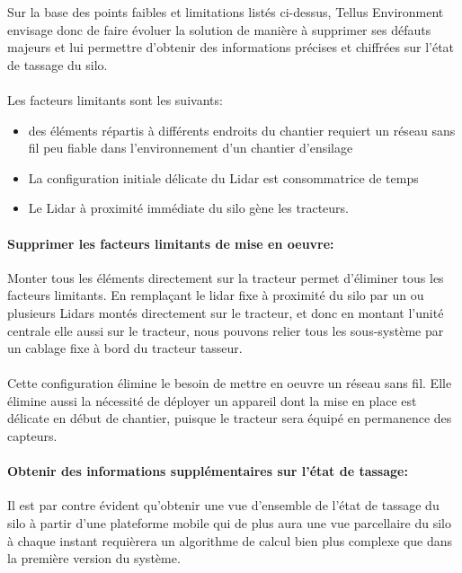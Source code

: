\documentclass[12pt,a4paper]{report}
\begin{document}
Sur la base des points faibles et limitations listés ci-dessus, Tellus Environment envisage donc de faire évoluer la solution de manière à supprimer ses défauts majeurs et lui permettre d'obtenir des informations précises et chiffrées sur l'état de tassage du silo.

\paragraph{} Les facteurs limitants sont les suivants:

\begin{itemize}
	\item des éléments répartis à différents endroits du chantier requiert un réseau sans fil peu fiable dans l'environnement d'un chantier d'ensilage
	\item La configuration initiale délicate du Lidar est consommatrice de temps
	\item Le Lidar à proximité immédiate du silo gène les tracteurs.
\end{itemize}

\paragraph{Supprimer les facteurs limitants de mise en oeuvre:} Monter tous les éléments directement sur la tracteur permet d'éliminer tous les facteurs limitants. 
En remplaçant le lidar fixe à proximité du silo par un ou plusieurs Lidars montés directement sur le tracteur, et donc en montant l'unité centrale elle aussi sur le tracteur, nous pouvons relier tous les sous-système par un cablage fixe à bord du tracteur tasseur.

\paragraph{} Cette configuration élimine le besoin de mettre en oeuvre un réseau sans fil. Elle élimine aussi la nécessité de déployer un appareil dont la mise en place est délicate en début de chantier, puisque le tracteur sera équipé en permanence des capteurs. 

\paragraph{Obtenir des informations supplémentaires sur l'état de tassage:} Il est par contre évident qu'obtenir une vue d'ensemble de l'état de tassage du silo à partir d'une plateforme mobile qui de plus aura une vue parcellaire du silo à chaque instant requièrera un algorithme de calcul bien plus complexe que dans la première version du système.
\end{document}
